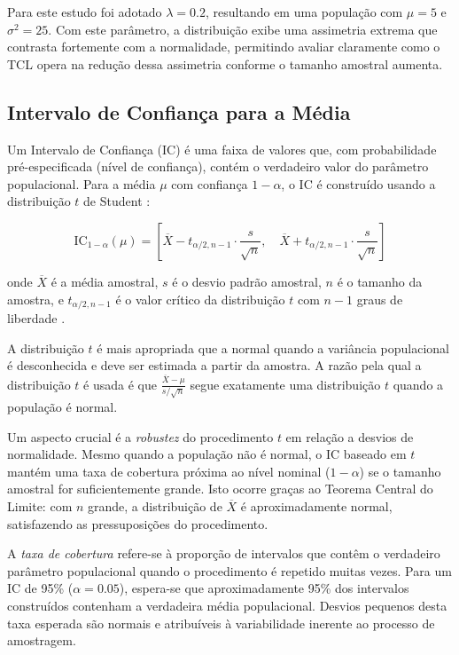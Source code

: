 \documentclass[12pt,a4paper]{article}
\begin{document}
Para este estudo foi adotado $\lambda = 0.2$, resultando em uma população com $\mu = 5$ e $\sigma^2 = 25$. Com este parâmetro, a distribuição exibe uma assimetria extrema que contrasta fortemente com a normalidade, permitindo avaliar claramente como o TCL opera na redução dessa assimetria conforme o tamanho amostral aumenta.

\subsection{Intervalo de Confiança para a Média}

Um Intervalo de Confiança (IC) é uma faixa de valores que, com probabilidade pré-especificada (nível de confiança), contém o verdadeiro valor do parâmetro populacional. Para a média $\mu$ com confiança $1 - \alpha$, o IC é construído usando a distribuição $t$ de Student \cite{montgomery2016}:

\begin{equation}
\text{IC}_{1-\alpha}(\mu) = \left[ \overline{X} - t_{\alpha/2, n-1} \cdot \frac{s}{\sqrt{n}}, \quad \overline{X} + t_{\alpha/2, n-1} \cdot \frac{s}{\sqrt{n}} \right]
\end{equation}

onde $\overline{X}$ é a média amostral, $s$ é o desvio padrão amostral, $n$ é o tamanho da amostra, e $t_{\alpha/2, n-1}$ é o valor crítico da distribuição $t$ com $n-1$ graus de liberdade \cite{devore2015}.

A distribuição $t$ é mais apropriada que a normal quando a variância populacional é desconhecida e deve ser estimada a partir da amostra. A razão pela qual a distribuição $t$ é usada é que $\frac{\overline{X} - \mu}{s/\sqrt{n}}$ segue exatamente uma distribuição $t$ quando a população é normal.

Um aspecto crucial é a \emph{robustez} do procedimento $t$ em relação a desvios de normalidade. Mesmo quando a população não é normal, o IC baseado em $t$ mantém uma taxa de cobertura próxima ao nível nominal ($1 - \alpha$) se o tamanho amostral for suficientemente grande. Isto ocorre graças ao Teorema Central do Limite: com $n$ grande, a distribuição de $\overline{X}$ é aproximadamente normal, satisfazendo as pressuposições do procedimento.

A \emph{taxa de cobertura} refere-se à proporção de intervalos que contêm o verdadeiro parâmetro populacional quando o procedimento é repetido muitas vezes. Para um IC de 95\% ($\alpha = 0.05$), espera-se que aproximadamente 95\% dos intervalos construídos contenham a verdadeira média populacional. Desvios pequenos desta taxa esperada são normais e atribuíveis à variabilidade inerente ao processo de amostragem.
\end{document}
